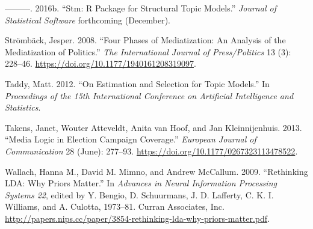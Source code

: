 \documentclass[
]{article}
\begin{document}
\leavevmode\hypertarget{ref-roberts_stm:_2016}{}%
---------. 2016b. ``Stm: R Package for Structural Topic Models.''
\emph{Journal of Statistical Software} forthcoming (December).

\leavevmode\hypertarget{ref-stromback_four_2008}{}%
Strömbäck, Jesper. 2008. ``Four Phases of Mediatization: An Analysis of
the Mediatization of Politics.'' \emph{The International Journal of
Press/Politics} 13 (3): 228--46.
\url{https://doi.org/10.1177/1940161208319097}.

\leavevmode\hypertarget{ref-taddy_estimation_2012}{}%
Taddy, Matt. 2012. ``On Estimation and Selection for Topic Models.'' In
\emph{Proceedings of the 15th International Conference on Artificial
Intelligence and Statistics}.

\leavevmode\hypertarget{ref-takens_media_2013}{}%
Takens, Janet, Wouter Atteveldt, Anita van Hoof, and Jan Kleinnijenhuis.
2013. ``Media Logic in Election Campaign Coverage.'' \emph{European
Journal of Communication} 28 (June): 277--93.
\url{https://doi.org/10.1177/0267323113478522}.

\leavevmode\hypertarget{ref-wallach_rethinking_2009}{}%
Wallach, Hanna M., David M. Mimno, and Andrew McCallum. 2009.
``Rethinking LDA: Why Priors Matter.'' In \emph{Advances in Neural
Information Processing Systems 22}, edited by Y. Bengio, D. Schuurmans,
J. D. Lafferty, C. K. I. Williams, and A. Culotta, 1973--81. Curran
Associates, Inc.
\url{http://papers.nips.cc/paper/3854-rethinking-lda-why-priors-matter.pdf}.
\end{document}
